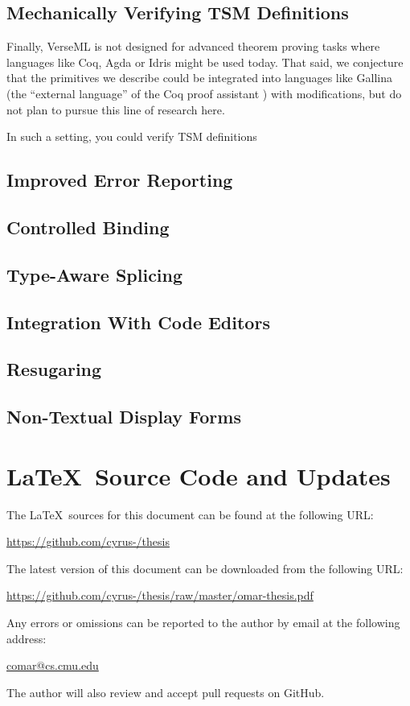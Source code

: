 \subsection{Mechanically Verifying TSM Definitions}\label{sec:verifying-tsms}
Finally, VerseML is not designed for advanced theorem proving tasks where languages like Coq, Agda or Idris might be used today. That said, we conjecture that the primitives we describe could be integrated into languages like Gallina (the ``external language'' of the Coq proof assistant  \cite{Coq:manual}) with  modifications, but do not plan to pursue this line of research here.

In such a setting, you could verify TSM definitions 
\subsection{Improved Error Reporting}\label{sec:error-handling}
\subsection{Controlled Binding}\label{sec:controlled-binding}
\subsection{Type-Aware Splicing}\label{sec:type-aware-splicing}
\subsection{Integration With Code Editors}\label{sec:interaction-with-tools}
\subsection{Resugaring}\label{sec:resugaring}
\subsection{Non-Textual Display Forms}\label{sec:non-textual-display-forms}

\newpage
\section*{\LaTeX~Source Code and Updates}
\noindent
The \LaTeX~sources for this document can be found at the following URL:
\begin{center}
\url{https://github.com/cyrus-/thesis}
\end{center}
The latest version of this document can be downloaded from the following URL:
\begin{center}
\url{https://github.com/cyrus-/thesis/raw/master/omar-thesis.pdf}
\end{center}
Any errors or omissions can be reported to the author by email at the following address:
\begin{center}
\url{comar@cs.cmu.edu}
\end{center}
The author will also review and accept pull requests on GitHub.